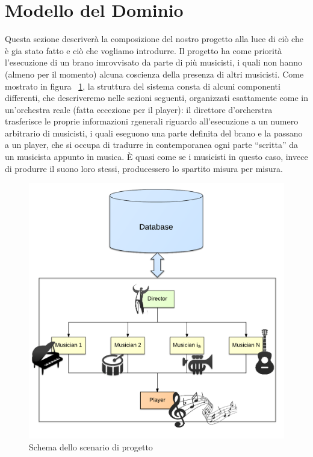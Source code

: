 \section{Modello del Dominio}

Questa sezione descriverà la composizione del nostro progetto alla luce di ciò che è gia stato fatto e ciò che vogliamo introdurre.
Il progetto ha come priorità l'esecuzione di un brano imrovvisato da parte di più musicisti, i quali non hanno (almeno per il momento) alcuna coscienza della presenza di altri musicisti.
Come mostrato in figura ~\ref{fig:dom}, la struttura del sistema consta di alcuni componenti differenti, che descriveremo nelle sezioni seguenti, organizzati esattamente come in un'orchestra reale (fatta eccezione per il player):
il direttore d'orcherstra trasferisce le proprie informazioni rgenerali riguardo all'esecuzione a un numero arbitrario di musicisti, i quali eseguono una parte definita del brano e la passano a un player, che si occupa di tradurre in contemporanea ogni parte ``scritta'' da un musicista appunto in musica.
È quasi come se i musicisti in questo caso, invece di produrre il suono loro stessi, producessero lo spartito misura per misura.

\begin{figure}[H]
\centering
\includegraphics[scale=0.30]{img/model.png}
\caption{Schema dello scenario di progetto}
\label{fig:dom}
\end{figure}


